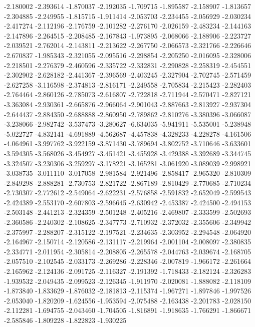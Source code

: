 -2.180002
-2.393614
-1.870037
-2.192035
-1.709715
-1.895587
-2.158907
-1.813657
-2.304885
-2.249955
-1.815715
-1.911414
-2.053703
-2.234455
-2.056929
-2.030234
-2.417274
-2.112196
-2.176759
-2.101282
-2.276170
-2.026159
-2.483234
-2.144163
-2.147896
-2.264515
-2.208485
-2.167843
-1.973895
-2.068066
-2.188906
-2.223727
-2.039521
-2.762014
-2.143811
-2.213622
-2.267750
-2.066573
-2.321766
-2.226646
-2.670837
-1.985343
-2.321055
-2.095516
-2.298854
-2.205250
-2.016095
-2.328006
-2.218501
-2.276379
-2.460596
-2.335722
-2.332831
-2.290828
-2.258319
-2.454551
-2.302902
-2.628182
-2.441367
-2.396569
-2.403245
-2.327904
-2.702745
-2.571459
-2.627258
-3.116598
-2.374813
-2.816171
-2.249558
-2.705834
-2.215423
-2.282403
-2.764464
-2.860126
-2.785073
-2.616807
-2.722818
-2.711944
-2.570471
-2.827121
-3.363084
-2.930361
-2.665876
-2.966064
-2.901043
-2.887663
-2.813927
-2.937304
-2.644437
-2.884350
-2.688888
-2.860950
-2.789862
-2.810276
-3.380396
-3.066087
-3.238066
-2.982742
-3.537473
-3.280627
-6.634035
-5.941911
-5.535001
-5.238948
-5.022727
-4.832141
-4.691889
-4.562687
-4.457838
-4.328233
-4.228278
-4.161506
-4.064961
-3.997762
-3.922159
-3.871430
-3.789694
-3.802752
-3.710646
-3.633601
-3.594305
-3.568026
-3.454927
-3.451421
-3.455928
-3.429388
-3.392689
-3.344745
-3.324507
-3.230306
-3.259297
-3.178221
-3.165281
-3.061920
-3.089039
-2.998921
-3.038735
-3.011110
-3.017058
-2.981584
-2.921496
-2.858417
-2.965320
-2.810309
-2.849298
-2.888281
-2.730753
-2.821722
-2.867189
-2.810429
-2.770685
-2.710234
-2.730307
-2.772612
-2.549064
-2.622231
-2.576858
-2.591832
-2.652049
-2.599543
-2.424389
-2.553170
-2.607803
-2.596645
-2.630942
-2.453387
-2.424500
-2.494153
-2.503148
-2.441213
-2.324359
-2.501248
-2.405216
-2.469807
-2.333599
-2.502693
-2.360586
-2.240302
-2.108625
-2.347773
-2.710932
-2.372032
-2.355606
-2.349942
-2.375997
-2.288207
-2.315122
-2.197521
-2.234635
-2.303952
-2.294548
-2.064920
-2.164967
-2.150714
-2.120586
-2.131117
-2.219964
-2.001104
-2.008097
-2.380835
-2.334771
-2.011954
-2.305814
-2.208805
-2.265578
-2.044763
-2.039674
-2.168705
-2.057510
-2.102545
-2.033173
-2.269286
-2.228346
-2.007819
-1.966172
-2.261664
-2.165962
-2.124136
-2.091725
-2.116327
-2.191392
-1.718433
-2.182124
-2.326283
-1.939532
-2.049435
-2.099523
-2.126345
-1.911970
-2.020081
-1.888082
-2.118109
-1.873840
-1.833629
-1.876032
-2.181813
-2.115374
-1.967271
-1.897846
-1.997526
-2.053040
-1.820209
-1.624556
-1.953594
-2.075488
-2.163438
-2.201783
-2.028150
-2.112281
-1.694755
-2.043460
-1.704505
-1.816891
-1.918635
-1.766291
-1.866671
-2.585846
-1.809228
-1.822823
-1.930225
